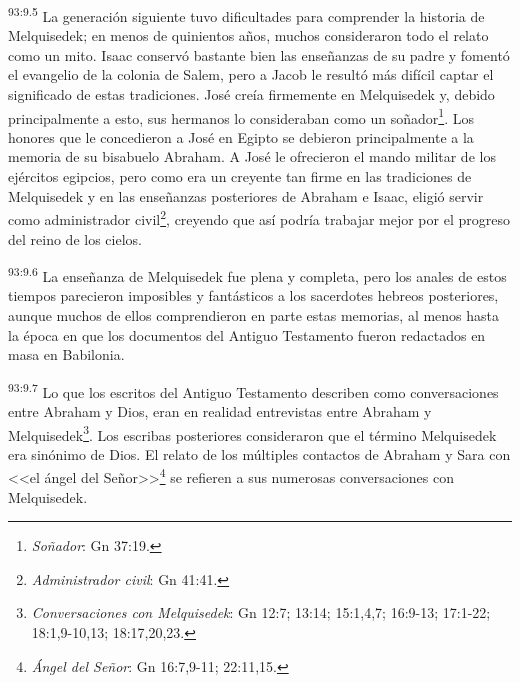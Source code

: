 \par
\textsuperscript{93:9.5} La generación siguiente tuvo dificultades para comprender la historia de Melquisedek; en menos de quinientos años, muchos consideraron todo el relato como un mito. Isaac conservó bastante bien las enseñanzas de su padre y fomentó el evangelio de la colonia de Salem, pero a Jacob le resultó más difícil captar el significado de estas tradiciones. José creía firmemente en Melquisedek y, debido principalmente a esto, sus hermanos lo consideraban como un soñador\footnote{\textit{Soñador}: Gn 37:19.}. Los honores que le concedieron a José en Egipto se debieron principalmente a la memoria de su bisabuelo Abraham. A José le ofrecieron el mando militar de los ejércitos egipcios, pero como era un creyente tan firme en las tradiciones de Melquisedek y en las enseñanzas posteriores de Abraham e Isaac, eligió servir como administrador civil\footnote{\textit{Administrador civil}: Gn 41:41.}, creyendo que así podría trabajar mejor por el progreso del reino de los cielos.

\par
\textsuperscript{93:9.6} La enseñanza de Melquisedek fue plena y completa, pero los anales de estos tiempos parecieron imposibles y fantásticos a los sacerdotes hebreos posteriores, aunque muchos de ellos comprendieron en parte estas memorias, al menos hasta la época en que los documentos del Antiguo Testamento fueron redactados en masa en Babilonia.

\par
\textsuperscript{93:9.7} Lo que los escritos del Antiguo Testamento describen como conversaciones entre Abraham y Dios, eran en realidad entrevistas entre Abraham y Melquisedek\footnote{\textit{Conversaciones con Melquisedek}: Gn 12:7; 13:14; 15:1,4,7; 16:9-13; 17:1-22; 18:1,9-10,13; 18:17,20,23.}. Los escribas posteriores consideraron que el término Melquisedek era sinónimo de Dios. El relato de los múltiples contactos de Abraham y Sara con <<el ángel del Señor>>\footnote{\textit{Ángel del Señor}: Gn 16:7,9-11; 22:11,15.} se refieren a sus numerosas conversaciones con Melquisedek.

